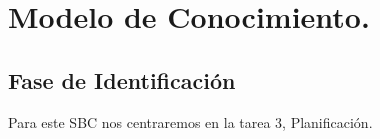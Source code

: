 \documentclass[12pt,a4paper,twoside,spanish]{article}      %
\begin{document}
 \pagestyle{myheadings} 

\setlength{\parindent}{1,5cm} \setlength{\parskip}{0,7cm}




\section{Modelo de Conocimiento.}


\subsection{Fase de Identificación}
Para este SBC nos centraremos en la tarea 3, Planificación.
\end{document}
